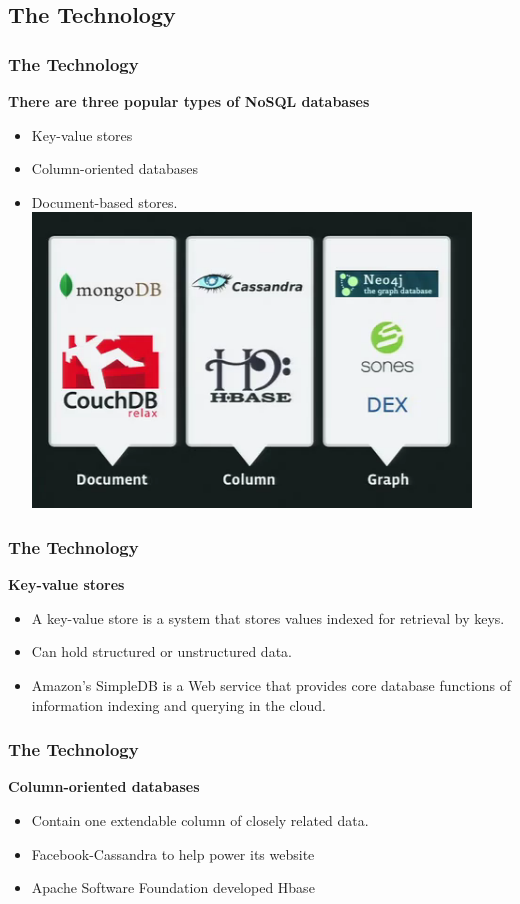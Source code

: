 \documentclass{beamer}
\begin{document}
\subsection[]{The Technology}
\begin{frame}\frametitle{The Technology}
\textbf{There are three popular types of NoSQL databases}
\begin{itemize}
\item Key-value stores
\item Column-oriented databases
\item Document-based stores.
\includegraphics[scale=0.55]{nosql.png}
\end{itemize}
\end{frame}

\begin{frame}\frametitle{The Technology}
\textbf{Key-value stores}
\begin{itemize}
\item A key-value store is a system that stores values indexed for retrieval by keys.
\item Can hold structured or unstructured data.
\item Amazon’s SimpleDB is a Web service that provides core database functions of information indexing and querying in the cloud.
\end{itemize}
\end{frame}

\begin{frame}\frametitle{The Technology}
\textbf{Column-oriented databases}
\begin{itemize}
\item Contain one extendable column of closely related data.
\item Facebook-Cassandra to help power its website
\item Apache Software Foundation developed Hbase
\end{itemize}
\end{frame}
\end{document}
